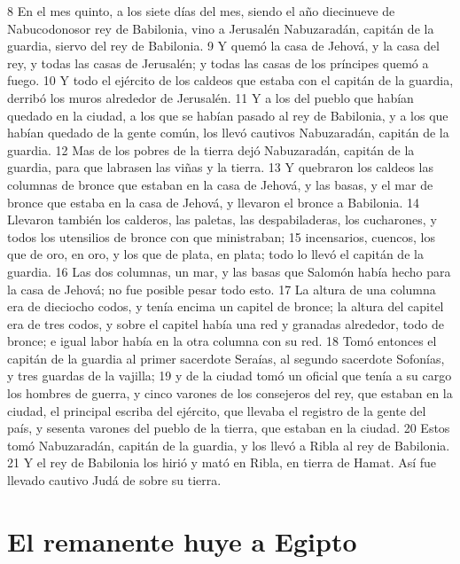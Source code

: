 8 En el mes quinto, a los siete días del mes, siendo el año diecinueve de Nabucodonosor rey de Babilonia, vino a Jerusalén Nabuzaradán, capitán de la guardia, siervo del rey de Babilonia.
9 Y quemó la casa de Jehová, y la casa del rey, y todas las casas de Jerusalén; y todas las casas de los príncipes quemó a fuego.
10 Y todo el ejército de los caldeos que estaba con el capitán de la guardia, derribó los muros alrededor de Jerusalén.
11 Y a los del pueblo que habían quedado en la ciudad, a los que se habían pasado al rey de Babilonia, y a los que habían quedado de la gente común, los llevó cautivos Nabuzaradán, capitán de la guardia.
12 Mas de los pobres de la tierra dejó Nabuzaradán, capitán de la guardia, para que labrasen las viñas y la tierra.
13 Y quebraron los caldeos las columnas de bronce que estaban en la casa de Jehová, y las basas, y el mar de bronce que estaba en la casa de Jehová, y llevaron el bronce a Babilonia.
14 Llevaron también los calderos, las paletas, las despabiladeras, los cucharones, y todos los utensilios de bronce con que ministraban; 
15 incensarios, cuencos, los que de oro, en oro, y los que de plata, en plata; todo lo llevó el capitán de la guardia.
16 Las dos columnas, un mar, y las basas que Salomón había hecho para la casa de Jehová; no fue posible pesar todo esto.
17 La altura de una columna era de dieciocho codos,  y tenía encima un capitel de bronce; la altura del capitel era de tres codos, y sobre el capitel había una red y granadas alrededor, todo de bronce; e igual labor había en la otra columna con su red.
18 Tomó entonces el capitán de la guardia al primer sacerdote Seraías, al segundo sacerdote Sofonías, y tres guardas de la vajilla;
19 y de la ciudad tomó un oficial que tenía a su cargo los hombres de guerra, y cinco varones de los consejeros del rey, que estaban en la ciudad, el principal escriba del ejército, que llevaba el registro de la gente del país, y sesenta varones del pueblo de la tierra, que estaban en la ciudad.
20 Estos tomó Nabuzaradán, capitán de la guardia, y los llevó a Ribla al rey de Babilonia.
21 Y el rey de Babilonia los hirió y mató en Ribla, en tierra de Hamat. Así fue llevado cautivo Judá de sobre su tierra.

\section*{El remanente huye a Egipto}


